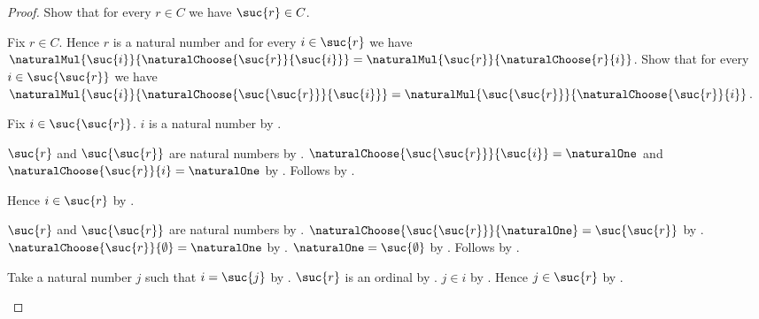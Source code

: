 \begin{proof}
    Show that for every $r\in C$ we have $\suc{r}\in C$.
    \begin{subproof}
        Fix $r\in C$.
        Hence $r$ is a natural number and for every $i\in\suc{r}$ we have
            $\naturalMul{\suc{i}}{
                \naturalChoose{\suc{r}}{\suc{i}}}
                =\naturalMul{\suc{r}}{\naturalChoose{r}{i}}$.
        Show that for every $i\in\suc{\suc{r}}$ we have
            $\naturalMul{\suc{i}}{
                \naturalChoose{\suc{\suc{r}}}{\suc{i}}}
                =\naturalMul{\suc{\suc{r}}}{
                    \naturalChoose{\suc{r}}{i}}$.
        \begin{subproof}
            Fix $i\in\suc{\suc{r}}$.
            $i$ is a natural number by
                .
            \begin{byCase}
                    $\suc{r}$ and $\suc{\suc{r}}$ are natural numbers by
                        .
                    $\naturalChoose{\suc{\suc{r}}}{\suc{i}}
                        =\naturalOne$ and
                        $\naturalChoose{\suc{r}}{i}=\naturalOne$ by
                        .
                    Follows by
                        .

                    Hence $i\in\suc{r}$ by .
                    \begin{byCase}
                            $\suc{r}$ and $\suc{\suc{r}}$ are natural
                                numbers by .
                            $\naturalChoose{\suc{\suc{r}}}{\naturalOne}
                                =\suc{\suc{r}}$ by
                                .
                            $\naturalChoose{\suc{r}}{\emptyset}
                                =\naturalOne$ by
                                .
                            $\naturalOne=\suc{\emptyset}$ by
                                .
                            Follows by
                                .

                            Take a natural number $j$ such that
                                $i=\suc{j}$ by
                                .
                            $\suc{r}$ is an ordinal by
                                .
                            $j\in i$ by .
                            Hence $j\in\suc{r}$ by
                                .


\end{byCase}
\end{byCase}
\end{subproof}
\end{subproof}
\end{proof}
